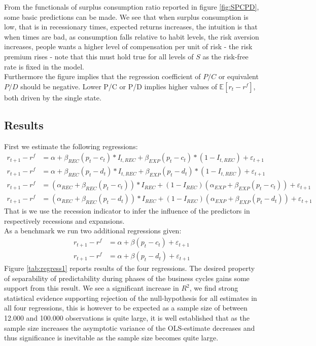 From the functionals of surplus consumption ratio reported in figure \ref{fig:SPCPD}, some basic predictions can be made. We see that when surplus consumption is low, that is in recessionary times, expected returns increases, the intuition is that when times are bad, as consumption falls relative to habit levels, the risk aversion increases, people wants a higher level of compensation per unit of risk - the risk premium rises - note that this must hold true for all levels of $S$ as the risk-free rate is fixed in the model. \\
Furthermore the figure implies that the regression coefficient of $P/C$ or equivalent $P/D$ should be negative. Lower P/C or P/D implies higher values of $\mathbb{E}\left[r_t-r^f\right]$, both driven by the single state. 


\subsection{Results}
First we estimate the following regressions:
\begin{align*}
     r_{t+1} - r^{f} &= \alpha + \beta_{REC} \left( p_t - c_t \right) * I_{t,REC} + \beta_{EXP} \left( p_t - c_t \right) * \left(1 - I_{t,REC}\right)  + \varepsilon_{t+1}\\
      r_{t+1} - r^{f} &= \alpha + \beta_{REC} \left( p_t - d_t \right) * I_{t,REC} + \beta_{EXP} \left( p_t - d_t \right) * \left(1 - I_{t,REC}\right)  + \varepsilon_{t+1}\\
      r_{t+1} - r^{f} &= \left(\alpha_{REC} + \beta_{REC} \left(p_t - c_t\right)\right)*I_{REC} + \left(1-I_{REC}\right) \left( \alpha_{EXP} + \beta_{EXP}\left(p_t - c_t \right) \right) + \varepsilon_{t+1}\\
r_{t+1} - r^{f} &= \left(\alpha_{REC} + \beta_{REC} \left(p_t - d_t\right)\right)*I_{REC} + \left(1-I_{REC}\right) \left( \alpha_{EXP} + \beta_{EXP}\left(p_t - d_t \right) \right) + \varepsilon_{t+1}      
\end{align*}
That is we use the recession indicator to infer the influence of the predictors in respectively recessions and expansions.\\
As a benchmark we run two additional regressions given:
\begin{align*}
     r_{t+1} - r^{f} &= \alpha + \beta \left( p_t - c_t \right)  + \varepsilon_{t+1}\\
      r_{t+1} - r^{f} &= \alpha + \beta \left( p_t - d_t \right) + \varepsilon_{t+1}
\end{align*}
Figure \ref{tab:regress1} reports results of the four regressions. The desired property of separability of predictability during phases of the business cycles gains some support from this result. We see a significant increase in $R^2$, we find strong statistical evidence supporting rejection of the null-hypothesis for all estimates in all four regressions, this is however to be expected as a sample size of between 12.000 and 100.000 observations is quite large, it is well established that as the sample size increases the asymptotic variance of the OLS-estimate decreases and thus significance is inevitable as the sample size becomes quite large.


